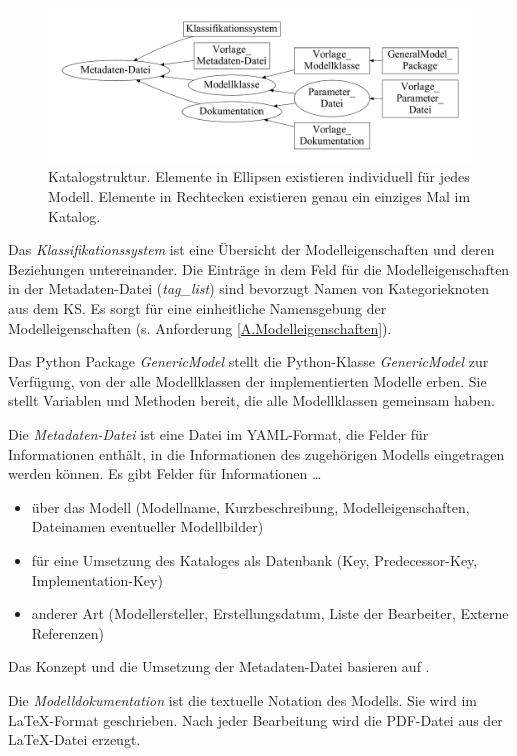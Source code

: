 \begin{figure}[H]
	\centering
	\includegraphics[width=1\linewidth]{Katalogstruktur}
	\caption[Katalogstruktur]{Katalogstruktur. Elemente in Ellipsen existieren individuell für jedes Modell. Elemente in Rechtecken existieren genau ein einziges Mal im Katalog.}
	\label{fig:Katalogstruktur}
\end{figure}
%
Das \textit{Klassifikationssystem} ist eine Übersicht der Modelleigenschaften und deren Beziehungen untereinander. Die Einträge in dem Feld für die Modelleigenschaften in der Metadaten-Datei (\textit{tag\_list}) sind bevorzugt Namen von Kategorieknoten aus dem KS. Es sorgt für eine einheitliche Namensgebung der Modelleigenschaften (s. Anforderung \ref{A.Modelleigenschaften}). 

Das Python Package \textit{GenericModel} stellt die Python-Klasse \textit{GenericModel} zur Verfügung, von der alle Modellklassen der implementierten Modelle erben. Sie stellt Variablen und Methoden bereit, die alle Modellklassen gemeinsam haben.

Die \textit{Metadaten-Datei} ist eine Datei im YAML-Format, die Felder für Informationen enthält, in die Informationen des zugehörigen Modells eingetragen werden können. Es gibt Felder für Informationen \dots 
\begin{itemize}[label=$\bullet$]
	\item über das Modell (Modellname, Kurzbeschreibung, Modelleigenschaften, Dateinamen eventueller Modellbilder)
	\item für eine Umsetzung des Kataloges als Datenbank (Key, Predecessor-Key, Implementation-Key)
	\item anderer Art (Modellersteller, Erstellungsdatum, Liste der Bearbeiter, Externe Referenzen)
\end{itemize}
Das Konzept und die Umsetzung der Metadaten-Datei basieren auf \cite{KNHE20b}. 

Die \textit{Modelldokumentation} ist die textuelle Notation des Modells. Sie wird im \LaTeX-Format geschrieben. Nach jeder Bearbeitung wird die PDF-Datei aus der \LaTeX-Datei erzeugt. 

